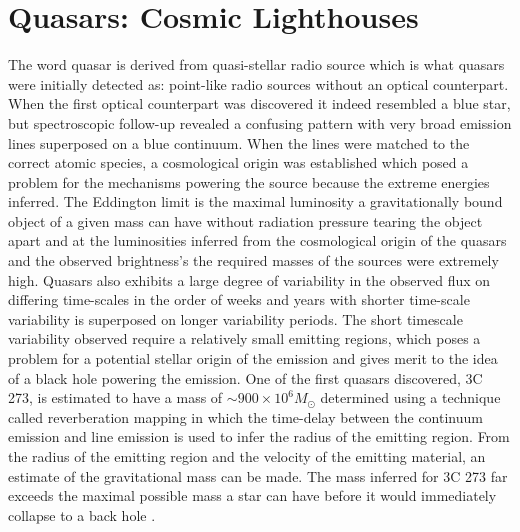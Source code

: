 \clearpage


\section{Quasars: Cosmic Lighthouses}
\label{sec:intro:qso}

The word quasar is derived from quasi-stellar radio source which is what
quasars
were initially detected as: point-like radio sources without an optical
counterpart. When the first optical counterpart was discovered it indeed
resembled a blue star, but spectroscopic follow-up revealed a confusing pattern
with very broad emission lines superposed on a blue continuum. When the lines
were matched to the correct atomic species, a cosmological origin was
established which posed a problem for the mechanisms powering the source because
the extreme energies inferred. The Eddington limit is the maximal luminosity a
gravitationally bound object of a given mass can have without radiation pressure
tearing the object apart and at the luminosities inferred from the cosmological
origin of the quasars and the observed brightness’s the required masses of the
sources were extremely high. Quasars also exhibits a large
degree of variability
in the observed flux on differing time-scales in the order
of weeks and years
with shorter time-scale variability is superposed on longer
variability periods.
The short timescale variability observed require a relatively small
emitting
regions, which poses a problem for a potential stellar origin of the
emission
and gives merit to the idea of a black hole powering the emission.
One of the
first quasars discovered, 3C 273, is estimated
to have a mass of $\sim900 \times
10^{6} M_\odot$ \citep{Peterson2004}
determined using a technique called
reverberation mapping in which the
time-delay between the continuum emission and
line emission is used to infer the
radius of the emitting region. From the
radius of the emitting region and the
velocity of the emitting material, an
estimate of the gravitational mass can be
made. The mass inferred for 3C 273 far
exceeds the maximal possible mass a star
can have before it would immediately
collapse to a back hole \citep{Belczynski2010}.


